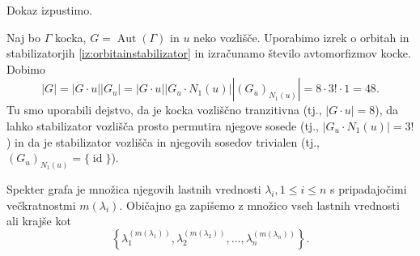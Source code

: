 \documentclass[fin1, tisk]{fmfdelo}
\newcommand{\aut}{\operatorname{Aut}}
\newcommand{\id}{\operatorname{id}}
\begin{document}
\begin{dokaz}
Dokaz izpustimo.
\end{dokaz}

\begin{zgled}
    Naj bo $\Gamma$ kocka, $G = \aut(\Gamma)$ in $u$ neko vozlišče. Uporabimo izrek o orbitah in stabilizatorjih \ref{iz:orbitainstabilizator}
    in izračunamo število avtomorfizmov kocke. Dobimo 
    $$|G| = |G\cdot u| |G_u| = |G\cdot u| |G_u\cdot N_1(u)| |(G_u)_{N_1(u)}| = 8\cdot 3! \cdot 1 = 48.$$
    Tu smo uporabili dejstvo, da je kocka vozliščno tranzitivna (tj., $|G\cdot u| = 8$), da lahko stabilizator vozlišča prosto permutira njegove 
    sosede (tj., $|G_u\cdot N_1(u)| = 3!$) in da je stabilizator vozlišča in njegovih sosedov trivialen (tj., $(G_u)_{N_1(u)} = \{\id\}$). 
\end{zgled}

\begin{definicija}
    Spekter grafa je množica njegovih lastnih vrednosti $\lambda_i, 1\leq i\leq n$ s pripadajočimi večkratnostmi
    $m(\lambda_i)$. Običajno ga zapišemo z množico vseh lastnih vrednosti ali krajše kot 
    $$\left\{\lambda_1^{(m(\lambda_1))}, \lambda_2^{(m(\lambda_2))}, \ldots, \lambda_n^{(m(\lambda_n))}\right\}.$$
\end{definicija}
\end{document}
